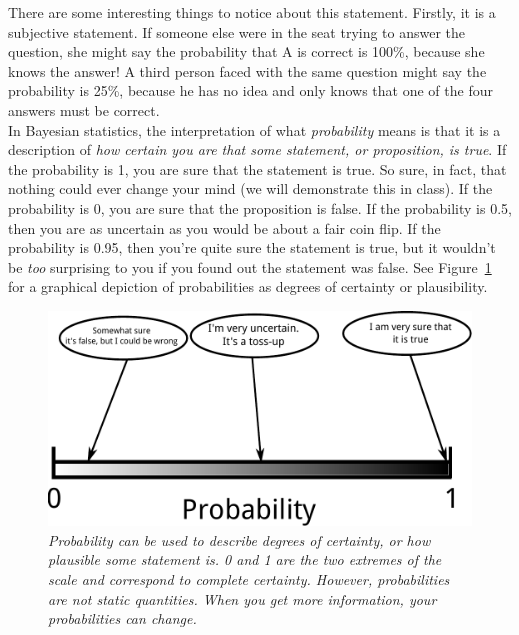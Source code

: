 There are some interesting
things to notice about this statement. Firstly, it is a subjective statement.
If someone else were in the seat trying to answer the question, she might say
the probability that A is correct is 100\%, because she knows the answer!
A third person faced with the same question might say the probability is 25\%,
because he has no idea and only knows that one of the four answers
must be correct.\\

In Bayesian statistics, the interpretation of what {\it probability} means is
that it is a description of {\it how certain you are that some statement, or
proposition, is true}.
If the probability is 1, you are sure that the statement is true. So sure, in
fact, that nothing could ever change your mind (we will demonstrate this in class).
If the probability is 0, you
are sure that the proposition is false. If the probability is 0.5, then you
are as uncertain as you would be about a fair coin flip. If the probability is
0.95, then you're quite sure the statement is true, but it wouldn't be {\it too}
surprising to you if you found out the statement was false. See
Figure~\ref{fig:probability_scale} for a graphical depiction of probabilities
as degrees of certainty or plausibility.\\

\begin{figure}
\begin{center}
\includegraphics[scale=0.6]{Figures/probability_scale.pdf}
\caption{\it Probability can be used to describe degrees of certainty, or
how plausible some statement is. 0 and 1 are the two extremes of the scale
and correspond to complete certainty. However, probabilities are not static
quantities. When you get more information, your probabilities can change.
\label{fig:probability_scale}}
\end{center}
\end{figure}


